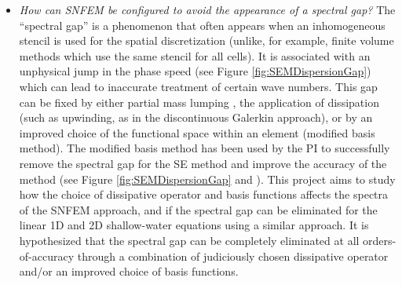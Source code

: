 \documentclass[11pt]{article}
\begin{document}
\vspace{-0.4cm}
\begin{itemize}
\item \textit{How can SNFEM be configured to avoid the appearance of a spectral gap?}  The ``spectral gap'' is a phenomenon that often appears when an inhomogeneous stencil is used for the spatial discretization (unlike, for example, finite volume methods which use the same stencil for all cells).  It is associated with an unphysical jump in the phase speed (see Figure \ref{fig:SEMDispersionGap}) which can lead to inaccurate treatment of certain wave numbers.  This gap can be fixed by either partial mass lumping \citep{ASMTCC2012QJRMS}, the application of dissipation (such as upwinding, as in the discontinuous Galerkin approach), or by an improved choice of the functional space within an element (modified basis method).  The modified basis method has been used by the PI to successfully remove the spectral gap for the SE method and improve the accuracy of the method (see Figure \ref{fig:SEMDispersionGap} and \cite{ullrich2014understanding}).  This project aims to study how the choice of dissipative operator and basis functions affects the spectra of the SNFEM approach, and if the spectral gap can be eliminated for the linear 1D and 2D shallow-water equations using a similar approach.  It is hypothesized that the spectral gap can be completely eliminated at all orders-of-accuracy through a combination of judiciously chosen dissipative operator and/or an improved choice of basis functions.



\end{itemize}
\end{document}
